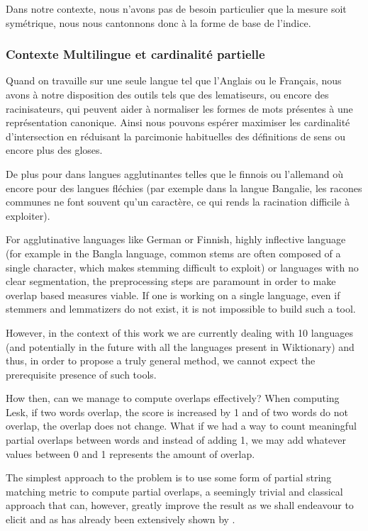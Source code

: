 \documentclass[10pt,a4paper,twoside]{article}
\begin{document}
Dans notre contexte, nous n'avons pas de besoin particulier que la mesure soit symétrique, nous nous cantonnons donc à la forme de base de l'indice. 
 
\subsubsection{Contexte Multilingue et cardinalité partielle}
Quand on travaille sur une seule langue tel que l'Anglais ou le Français, nous avons à notre disposition des outils tels que des lematiseurs, ou encore des racinisateurs, qui peuvent aider à normaliser les formes de mots présentes à une représentation canonique. Ainsi nous pouvons espérer maximiser les cardinalité d'intersection en réduisant la parcimonie habituelles des définitions de sens ou encore plus des gloses. 

De plus pour dans langues agglutinantes telles que le finnois ou l'allemand où encore pour des langues fléchies (par exemple dans la langue Bangalie, les racones communes ne font souvent qu'un caractère, ce qui rends la racination difficile à exploiter).

 For agglutinative languages like German or Finnish, highly inflective language (for example in the Bangla language, common stems are often composed of a single character, which makes stemming difficult to exploit) or languages with no clear segmentation, the preprocessing steps are paramount in order to make overlap based measures viable. If one is working on a single language, even if stemmers and lemmatizers do not exist, it is not impossible to build such a tool.

However, in the context of this work we are currently dealing with 10 languages (and potentially in the future with all the languages present in Wiktionary) and thus, in order to propose a truly general method, we cannot expect the prerequisite presence of such tools. 

How then, can we manage to compute overlaps effectively? When computing Lesk, if two words overlap, the score is increased by 1 and of two words do not overlap, the overlap does not change. What if we had a way to count meaningful partial overlaps between words and instead of adding 1, we may add whatever values between 0 and 1 represents the amount of overlap.

The simplest approach to the problem is to use some form of partial string matching metric to compute partial overlaps, a seemingly trivial and classical approach that can, however, greatly improve the result as we shall endeavour to elicit and as has already been extensively shown by \cite{Jimenez2012}. 
\end{document}
